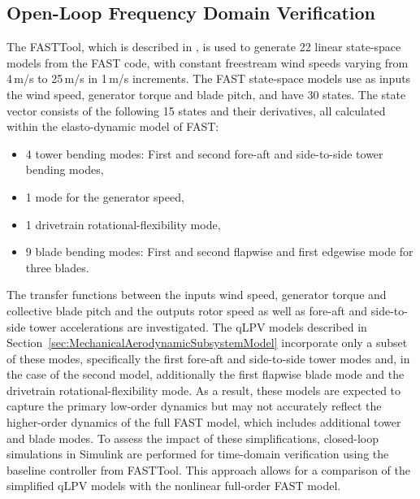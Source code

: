     \subsection{Open-Loop Frequency Domain Verification}
    The FASTTool, which is described in \cite{mulders2020wind}, is used to generate 22 linear state-space models from the FAST code, with constant freestream wind speeds varying from 4\,m/s to 25\,m/s in 1\,m/s increments. The FAST state-space models use as inputs the wind speed, generator torque and blade pitch, and have 30 states. %
    The state vector consists of the following 15 states and their derivatives, all calculated within the elasto-dynamic model of FAST:
    \begin{itemize}
        \item 4 tower bending modes: First and second fore-aft and side-to-side tower bending modes,
        \item 1 mode for the generator speed,
        \item 1 drivetrain rotational-flexibility mode,
        \item 9 blade bending modes: First and second flapwise and first edgewise mode for three blades.
    \end{itemize}
    The transfer functions between the inputs wind speed, generator torque and collective blade pitch and the outputs rotor speed as well as fore-aft and side-to-side tower accelerations are investigated. The qLPV models described in Section~\ref{sec:MechanicalAerodynamicSubsystemModel} incorporate only a subset of these modes, specifically the first fore-aft and side-to-side tower modes and, in the case of the second model, additionally the first flapwise blade mode and the drivetrain rotational-flexibility mode. As a result, these models are expected to capture the primary low-order dynamics but may not accurately reflect the higher-order dynamics of the full FAST model, which includes additional tower and blade modes. To assess the impact of these simplifications, closed-loop simulations in Simulink are performed for time-domain verification using the baseline controller from FASTTool. This approach allows for a comparison of the simplified qLPV models with the nonlinear full-order FAST model.
